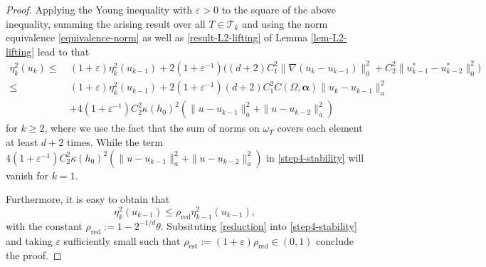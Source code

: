 \documentclass[preprint,times]{elsarticle}%
\numberwithin{algorithm}{section}
\numberwithin{equation}{section}
\newcommand{\est}{\mathrm{est}}
\newcommand{\reduce}{\mathrm{red}}
\newcommand{\anorm}[1]{\|#1\|_a}
\newcommand{\veps}{\varepsilon}
\newcommand{\valpha}{\boldsymbol{\alpha}}
\newcommand{\mcT}{\mathcal{T}}
\newcommand{\Ltw}[1]{\|#1\|_0}
\def\leq{\leqslant}
\def\geq{\geqslant}
\begin{document}
\begin{proof}
Applying the Young inequality with $\veps > 0$ to the square of the above inequality, summing the arising result over all $T \in \mcT_k$ and using the norm equivalence \eqref{equivalence-norm} as well as \eqref{result-L2-lifting} of Lemma \ref{lem-L2-lifting} lead to that 
\begin{align}
	\eta_k^2( u_k) \leq~& (1+\veps)\eta_k^2(u_{k-1})
		+2(1+\veps^{-1})\Big((d+2)C_1^2\Ltw{\nabla(u_k-u_{k-1})}^2 
		+C_2^2\Ltw{u_{k-1}^*-u_{k-2}^*}^2\Big)\nonumber\\
		\leq~&(1+\veps)\eta_k^2(u_{k-1}) + 2(1+\veps^{-1})(d+2)C_1^2C(\Omega,\valpha)
		\anorm{u_k-u_{k-1}}^2 \nonumber\\
		&+4(1+\veps^{-1})C_2^2\kappa(h_0)^2(\anorm{u-u_{k-1}}^2 + \anorm{u-u_{k-2}}^2)
		\label{step4-stability} 
\end{align}
for $k \geq 2$, where we use the fact that the sum of norms on $\omega_T$ covers each element at least $d+2$ times. While the term $4(1+\veps^{-1})C_2^2\kappa(h_0)^2(\anorm{u-u_{k-1}}^2 + \anorm{u-u_{k-2}}^2)$ in \eqref{step4-stability} will vanish for $k=1$. 

 Furthermore, it is easy to obtain that 
 \begin{equation}\label{reduction}
 	\eta_k^2(u_{k-1}) \leq \rho_\reduce\eta_{k-1}^2(u_{k-1}), 
 \end{equation}
 with the constant $\rho_\reduce:= 1 - 2^{-1/d}\theta$. Subsituting \eqref{reduction} into \eqref{step4-stability} and taking $\veps$ sufficiently small such that 
 $\rho_\est := (1+\veps)\rho_\reduce \in (0,1)$ conclude the proof. 
% 
\end{proof}
\end{document}
